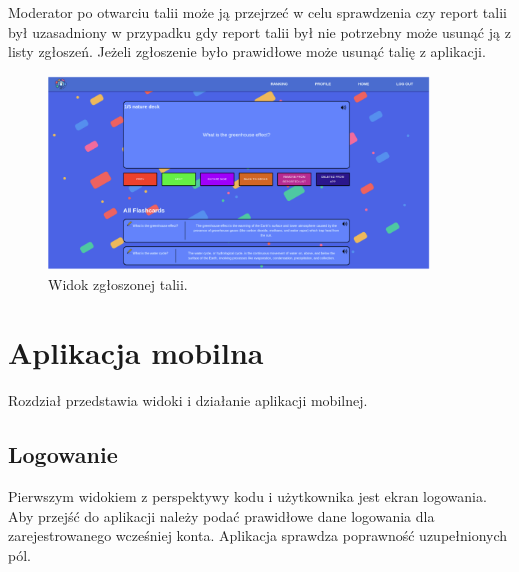 Moderator po otwarciu talii może ją przejrzeć w celu sprawdzenia czy report talii był uzasadniony w przypadku gdy report talii był nie potrzebny może usunąć ją z listy zgłoszeń. Jeżeli zgłoszenie było prawidłowe może usunąć talię z aplikacji.


\begin{figure}[H]
    \centering
    \includegraphics[width=0.9\textwidth]{chapters/chapter_10/images_web/web_reported_deck_2}
    \caption{Widok zgłoszonej talii.}
    \label{img:web_reported_deck_2}
\end{figure}


\section{Aplikacja mobilna}
Rozdział przedstawia widoki i działanie aplikacji mobilnej. 


\subsection{Logowanie}
Pierwszym widokiem z perspektywy kodu i użytkownika jest ekran logowania. Aby przejść do aplikacji należy podać prawidłowe dane logowania dla zarejestrowanego wcześniej konta. Aplikacja sprawdza poprawność uzupełnionych pól.



